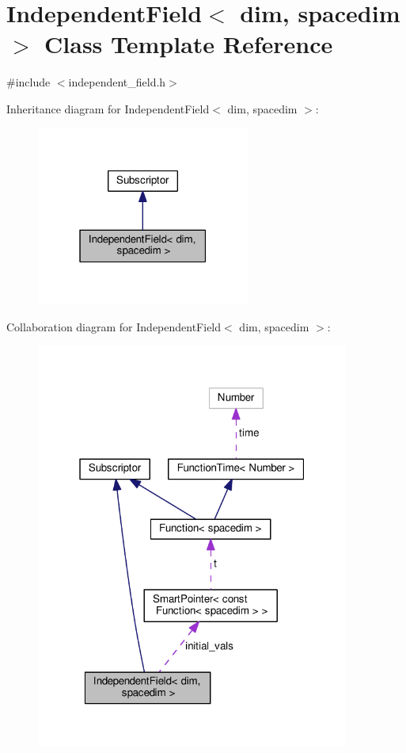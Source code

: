 \hypertarget{class_independent_field}{}\section{Independent\+Field$<$ dim, spacedim $>$ Class Template Reference}
\label{class_independent_field}


{\ttfamily \#include $<$independent\+\_\+field.\+h$>$}



Inheritance diagram for Independent\+Field$<$ dim, spacedim $>$\+:
\nopagebreak
\begin{figure}[H]
\begin{center}
\leavevmode
\includegraphics[width=199pt]{class_independent_field__inherit__graph}
\end{center}
\end{figure}


Collaboration diagram for Independent\+Field$<$ dim, spacedim $>$\+:
\nopagebreak
\begin{figure}[H]
\begin{center}
\leavevmode
\includegraphics[width=292pt]{class_independent_field__coll__graph}
\end{center}
\end{figure}
